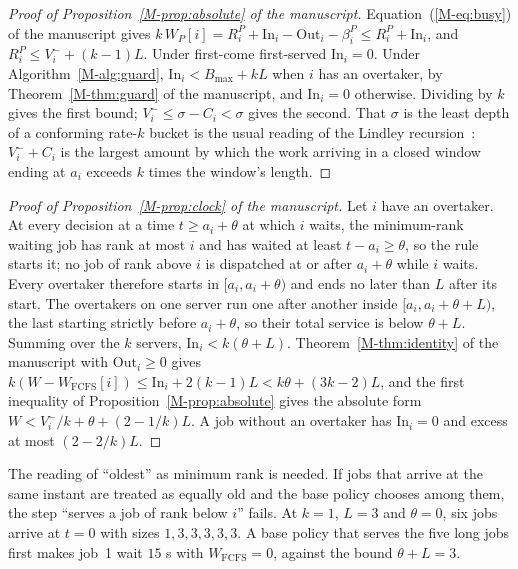 \documentclass[mathematics,supfile,submit,moreauthors]{Definitions/mdpi}
\begin{document}
\begin{proof}[Proof of Proposition~\ref*{M-prop:absolute} of the manuscript]
Equation~(\ref*{M-eq:busy}) of the manuscript gives
$k\,W_P[i] = R^P_i + \mathrm{In}_i - \mathrm{Out}_i - \beta^P_i \le R^P_i + \mathrm{In}_i$,
and $R^P_i \le V_i^- + (k-1)L$. Under first-come first-served $\mathrm{In}_i = 0$.
Under Algorithm~\ref*{M-alg:guard}, $\mathrm{In}_i < B_{\max} + kL$ when $i$ has an overtaker, by
Theorem~\ref*{M-thm:guard} of the manuscript, and $\mathrm{In}_i = 0$ otherwise. Dividing by $k$ gives
the first bound; $V_i^- \le \sigma - C_i < \sigma$ gives the second. That $\sigma$ is the
least depth of a conforming rate-$k$ bucket is the usual reading of the Lindley
recursion~\cite{cruz1991calculus}: $V_i^- + C_i$ is the largest amount by which the work
arriving in a closed window ending at $a_i$ exceeds $k$ times the window's length.
\end{proof}

\begin{proof}[Proof of Proposition~\ref*{M-prop:clock} of the manuscript]
Let $i$ have an overtaker. At every decision at a time $t \ge a_i + \theta$ at which
$i$ waits, the minimum-rank waiting job has rank at most $i$ and has waited at least
$t - a_i \ge \theta$, so the rule starts it; no job of rank above $i$ is dispatched at or
after $a_i + \theta$ while $i$ waits. Every overtaker therefore starts in
$[a_i, a_i + \theta)$ and ends no later than $L$ after its start. The overtakers on one
server run one after another inside $[a_i, a_i + \theta + L)$, the last starting
strictly before $a_i + \theta$, so their total service is below $\theta + L$. Summing
over the $k$ servers, $\mathrm{In}_i < k(\theta + L)$. Theorem~\ref*{M-thm:identity} of the manuscript with
$\mathrm{Out}_i \ge 0$ gives
$k(W - W_{\mathrm{FCFS}}[i]) \le \mathrm{In}_i + 2(k-1)L < k\theta + (3k-2)L$, and the
first inequality of Proposition~\ref*{M-prop:absolute} gives the absolute form
$W < V_i^-/k + \theta + (2-1/k)L$. A job without an overtaker has
$\mathrm{In}_i = 0$ and excess at most $(2-2/k)L$.
\end{proof}

The reading of ``oldest'' as minimum rank is needed. If jobs that arrive at the same
instant are treated as equally old and the base policy chooses among them, the step
``serves a job of rank below $i$'' fails. At $k = 1$, $L = 3$ and $\theta = 0$, six jobs
arrive at $t = 0$ with sizes $1, 3, 3, 3, 3, 3$. A base policy that serves the five
long jobs first makes job~1 wait $15$ s with $W_{\mathrm{FCFS}} = 0$, against the bound
$\theta + L = 3$.
\end{document}
